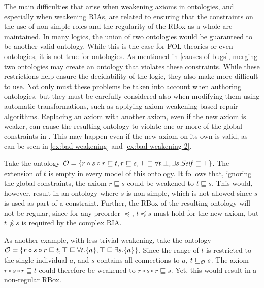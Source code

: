 
The main difficulties that arise when weakening axioms in \SROIQ ontologies, and especially when weakening RIAs, are related to ensuring that the constraints on the use of non-simple roles and the regularity of the RBox as a whole are maintained. In many logics, the union of two ontologies would be guaranteed to be another valid ontology. While this is the case for FOL theories or even \ALC ontologies, it is not true for \SROIQ ontologies. As mentioned in \cref{causes-of-bugs}, merging two \SROIQ ontologies may create an ontology that violates these constraints. While these restrictions help ensure the decidability of the logic, they also make \SROIQ more difficult to use. Not only must these problems be taken into account when authoring ontologies, but they must be carefully considered also when modifying them using automatic transformations, such as applying axiom weakening based repair algorithms. Replacing an axiom with another axiom, even if the new axiom is weaker, can cause the resulting ontology to violate one or more of the global constraints in \SROIQ. This may happen even if the new axiom on its own is valid, as can be seen in \cref{ex:bad-weakening} and \cref{ex:bad-weakening-2}.

\begin{example} \label{ex:bad-weakening}
  Take the ontology $\mathcal{O} = \{ r \circ s \circ r \sqsubseteq t, r \sqsubseteq s, \top \sqsubseteq \forall t.\bot, \exists s.\mathit{Self} \sqsubseteq \top \}$. The extension of $t$ is empty in every model of this ontology. It follows that, ignoring the global constraints, the axiom $r \sqsubseteq s$ could be weakened to $t \sqsubseteq s$. This would, however, result in an ontology where $s$ is non-simple, which is not allowed since $s$ is used as part of a \self constraint.
  Further, the RBox of the resulting ontology will not be regular, since for any preorder $\preceq$, $t \preceq s$ must hold for the new axiom, but $t \not\preceq s$ is required by the complex RIA.
\end{example}

\begin{example} \label{ex:bad-weakening-2}
  As another example, with less trivial weakening, take the ontology $\mathcal{O} = \{ r \circ s \circ r \sqsubseteq t, \top \sqsubseteq \forall t.\{a\}, \top \sqsubseteq \exists s.\{a\} \}$. Since the range of $t$ is restricted to the single individual $a$, and $s$ contains all connections to $a$, $t \sqsubseteq_\mathcal{O} s$. The axiom $r \circ s \circ r \sqsubseteq t$ could therefore be weakened to $r \circ s \circ r \sqsubseteq s$. Yet, this would result in a non-regular RBox.
\end{example}


